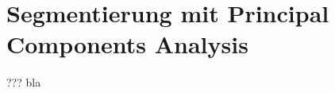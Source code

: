 \section{Segmentierung mit Principal Components Analysis}
\begin{frame}[t,fragile]{???}
	bla
\end{frame}